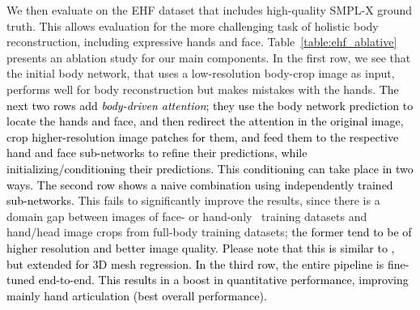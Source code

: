 \documentclass[runningheads]{llncs}
\newcommand{\highlightCR}[1]{{\textcolor{black}{{#1}}}}
\newcommand{\smplx}{\mbox{SMPL-X}\xspace}
\newcommand{\threeD}{3D\xspace}
\newcommand{\ehf}{\mbox{EHF}\xspace}
\begin{document}
 

We then evaluate on the \ehf dataset that includes high-quality \smplx ground truth.
This allows evaluation for the more challenging task of holistic body reconstruction, including expressive hands and face.
Table~\ref{table:ehf_ablative} presents an ablation study for our main components.
In the first row, we see that the initial body network, that uses a low-resolution body-crop image as input,
performs well for body reconstruction but makes mistakes with the
hands. \highlightCR{The next two rows add {\it body-driven attention}; they use the body network prediction to locate the hands and face,
and then redirect the attention in the original image, crop higher-resolution image patches for them, and feed them to the respective hand and face sub-networks to refine their predictions,
while initializing/conditioning their predictions.}
\highlightCR{This conditioning can take place in two ways.}
\highlightCR{The second row shows a naive combination using independently trained sub-networks.}
This fails to significantly improve the results,
since there is a domain gap between images of face- or hand-only~\cite{feng2018evaluation,Freihand2019} training datasets and
hand/head image crops from full-body \cite{andriluka20142d,johnson2010clustered,johnson2011learning} training datasets;
\highlightCR{the former tend to be of higher resolution and better image
quality.} \highlightCR{Please note that this is similar to \cite{cao2018openpose}, but extended for \threeD mesh regression.}
\highlightCR{In the third row, the entire pipeline is fine-tuned
  end-to-end.}
\highlightCR{This results in a boost in quantitative performance,
  improving mainly hand articulation (best overall performance).} 
\end{document}
